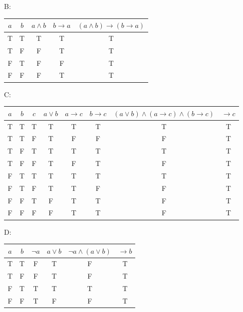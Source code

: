 \documentclass[10pt]{exam}
\begin{document}
\begin{questions}
\begin{solution}
    B: 
    \begin{center}
    \begin{tabular}{|c|c|c|c|c|}
    \hline
    $a$ & $b$ & $a \wedge b$ & $b \to a$ & $(a \wedge b) \to (b \to a)$ \\ \hline
    T & T & T & T & T \\ \hline
    T & F & F & T & T \\ \hline
    F & T & F & F & T \\ \hline
    F & F & F & T & T \\ \hline
    \end{tabular}
    \end{center}

    C:
    \begin{center}
    \begin{tabular}{|c|c|c|c|c|c|c|c|}
    \hline
    $a$ & $b$ & $c$ & $a \lor b$ & $a \to c$ & $b \to c$ &
    $(a \lor b)\land(a \to c)\land(b \to c)$ &
    $\to c$ \\ \hline
    T & T & T & T & T & T & T & T \\ \hline
    T & T & F & T & F & F & F & T \\ \hline
    T & F & T & T & T & T & T & T \\ \hline
    T & F & F & T & F & T & F & T \\ \hline
    F & T & T & T & T & T & T & T \\ \hline
    F & T & F & T & T & F & F & T \\ \hline
    F & F & T & F & T & T & F & T \\ \hline
    F & F & F & F & T & T & F & T \\ \hline
    \end{tabular}
    \end{center}

    D:
    \begin{center}
    \begin{tabular}{|c|c|c|c|c|c|}
    \hline
    $a$ & $b$ & $\neg a$ & $a \lor b$ & $\neg a \wedge (a \lor b)$ & $\to b$ \\ \hline
    T & T & F & T & F & T \\ \hline
    T & F & F & T & F & T \\ \hline
    F & T & T & T & T & T \\ \hline
    F & F & T & F & F & T \\ \hline
    \end{tabular}
    \end{center}
\end{solution}


\end{questions}
\end{document}
